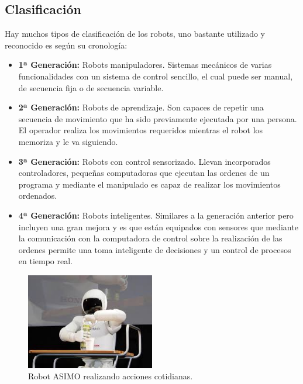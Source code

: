 \subsection{Clasificación}
\hspace{1cm} Hay muchos tipos de clasificación de los robots, uno bastante utilizado y reconocido es según su cronología:

\begin{itemize}
		\item \textbf{1ª Generación:} Robots manipuladores. Sistemas mecánicos de varias funcionalidades con un sistema de control sencillo, el cual puede ser manual, de secuencia fija o de secuencia variable.

	\item\textbf{2ª Generación:} Robots de aprendizaje. Son capaces de repetir una secuencia de movimiento que ha sido previamente ejecutada por una persona. El operador realiza los movimientos requeridos mientras el robot los memoriza y le va siguiendo. 

	\item\textbf{3ª Generación:} Robots con control sensorizado. Llevan incorporados controladores, pequeñas computadoras que ejecutan las ordenes de un programa y mediante el manipulado es capaz de realizar los movimientos ordenados.

	\item\textbf{4ª Generación:} Robots inteligentes. Similares a la generación anterior pero incluyen una gran mejora y es que están equipados con sensores que mediante la comunicación con la computadora de control sobre la realización de las ordenes permite una toma inteligente de decisiones y un control de procesos en tiempo real.
\end{itemize}

\begin{figure}[H]
	\begin{center}
		\includegraphics[width=0.5\textwidth]{imag/IMG11.jpeg}
				\caption{Robot ASIMO realizando acciones cotidianas.} 
	\label{fig:Robot ASIMO.}	
	\end{center}
\end{figure}

